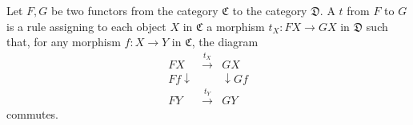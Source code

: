 Let $F, G$ be two functors from the category $\mathfrak{C}$ to the category $\mathfrak{D}$. A  $t$ from $F$ to $G$ is a rule assigning to each object $X$ in $\mathfrak{C}$ a morphism $t_X: FX \to GX$ in $\mathfrak{D}$ such that, for any morphism $f: X \to Y$ in $\mathfrak{C}$, the diagram
$$\begin{array}{ccc}
FX & \xrightarrow{t_X} & GX \\
{\scriptstyle Ff}\downarrow & & \downarrow{\scriptstyle Gf} \\
FY & \xrightarrow{t_Y} & GY
\end{array}$$
commutes.
